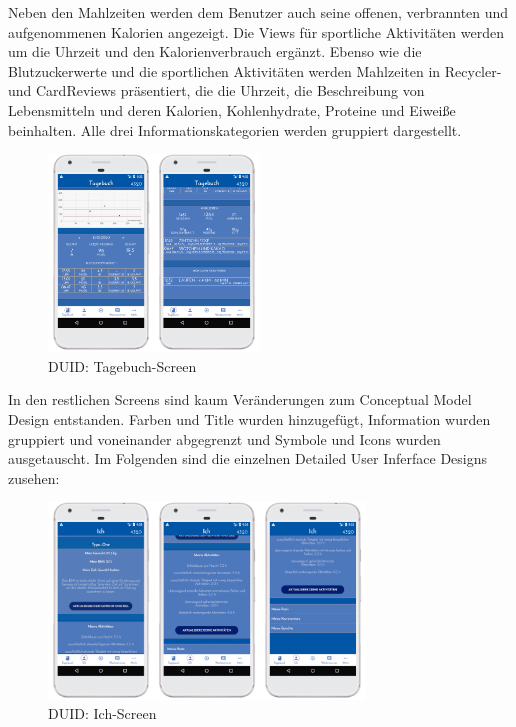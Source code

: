 	Neben den Mahlzeiten werden dem Benutzer auch seine offenen, verbrannten und aufgenommenen Kalorien angezeigt. Die Views für sportliche Aktivitäten werden um die Uhrzeit und den Kalorienverbrauch ergänzt.\newline
	Ebenso wie die Blutzuckerwerte und die sportlichen Aktivitäten werden Mahlzeiten in Recycler- und CardReviews präsentiert, die die Uhrzeit, die Beschreibung von Lebensmitteln und deren Kalorien, Kohlenhydrate, Proteine und Eiweiße beinhalten. Alle drei Informationskategorien werden gruppiert dargestellt.

\begin{figure}[H]
	\centering
	\includegraphics[width=0.5\textwidth]{images/tagebuchscreen_digital.png}
	\captionsetup{justification=centering}
	\caption{DUID: Tagebuch-Screen}
	\label{img:DUIDtagebuchscreen}
\end{figure}
In den restlichen Screens sind kaum Veränderungen zum Conceptual Model Design entstanden. Farben und Title wurden hinzugefügt, Information wurden gruppiert und voneinander abgegrenzt und Symbole und Icons wurden ausgetauscht. Im Folgenden sind die einzelnen Detailed User Inferface Designs zusehen:\\
\begin{figure}[H]
	\centering
	\includegraphics[width=0.75\textwidth]{images/ichscreen_digital.png}
	\captionsetup{justification=centering}
	\caption{DUID: Ich-Screen}
	\label{img:DUIDichscreen}
\end{figure}
